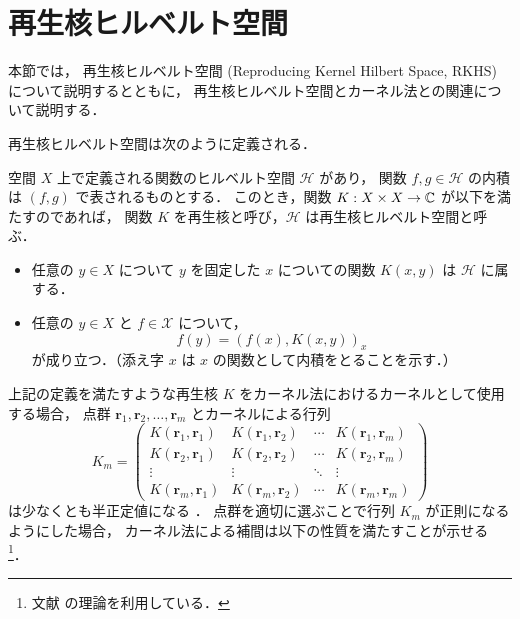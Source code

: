 %

\section{再生核ヒルベルト空間}\label{sec:interp_kernel_rkhs}

本節では，
再生核ヒルベルト空間 (Reproducing Kernel Hilbert Space, RKHS)
について説明するとともに，
再生核ヒルベルト空間とカーネル法との関連について説明する．

再生核ヒルベルト空間は次のように定義される．

\begin{definition}
    空間 $X$ 上で定義される関数のヒルベルト空間 $\mathcal{H}$ があり，
    関数 $f, g \in \mathcal{H}$ の内積は $(f, g)$ で表されるものとする．
    このとき，関数 $K : X \times X \to \mathbb{C}$ が以下を満たすのであれば，
    関数 $K$ を再生核と呼び，$\mathcal{H}$ は再生核ヒルベルト空間と呼ぶ．
    \begin{itemize}
        \item 任意の $y \in X$ について $y$ を固定した $x$ についての関数 $K(x,y)$ は
              $\mathcal{H}$ に属する．
        \item 任意の $y \in X$ と $f \in \mathcal{X}$ について，
              \begin{equation}
                  f(y) = (f(x), K(x, y))_x
              \end{equation}
              が成り立つ．（添え字 $x$ は $x$ の関数として内積をとることを示す．）
    \end{itemize}
\end{definition}

上記の定義を満たすような再生核 $K$ をカーネル法におけるカーネルとして使用する場合，
点群 $\bm{r}_1, \bm{r}_2, \ldots, \bm{r}_m$ とカーネルによる行列
\begin{equation}
    K_m =
    \begin{pmatrix}
        K(\bm{r}_1, \bm{r}_1) & K(\bm{r}_1, \bm{r}_2) & \cdots & K(\bm{r}_1, \bm{r}_m) \\
        K(\bm{r}_2, \bm{r}_1) & K(\bm{r}_2, \bm{r}_2) & \cdots & K(\bm{r}_2, \bm{r}_m) \\
        \vdots                & \vdots                & \ddots & \vdots                \\
        K(\bm{r}_m, \bm{r}_1) & K(\bm{r}_m, \bm{r}_2) & \cdots & K(\bm{r}_m, \bm{r}_m)
    \end{pmatrix}
\end{equation}
は少なくとも半正定値になる
\cite{Aronszajn1950}．
点群を適切に選ぶことで行列 $K_m$ が正則になるようにした場合，
カーネル法による補間は以下の性質を満たすことが示せる
\footnote{文献 \cite{Kimeldorf1971,Wahba1981} の理論を利用している．}．


